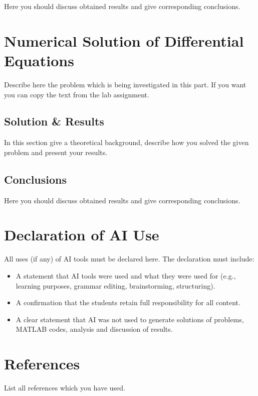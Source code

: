 \documentclass{article}
\begin{document}
Here you should discuss obtained results and give corresponding conclusions.


\newpage


\section{Numerical Solution of Differential Equations}

Describe here the problem which is being investigated in this part. If you want you can copy the text from the lab assignment.  

\subsection{Solution \& Results}

In this section give a theoretical background, describe how you solved the given problem and present your results.

\subsection{Conclusions}

Here you should discuss obtained results and give corresponding conclusions.

\newpage

\section*{Declaration of AI Use}

All uses (if any) of AI tools must be declared here. The declaration must include:
\begin{itemize}
\item A statement that AI tools were used and what they were used for (e.g., learning purposes, grammar editing, brainstorming, structuring).
\item A confirmation that the students retain full responsibility for all content.
\item A clear statement that AI was not used to generate solutions of problems, MATLAB codes, analysis and  discussion of results.
\end{itemize}

\newpage

\section*{References}

List all references which you have used. 
\end{document}
